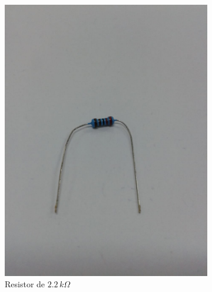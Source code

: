 \documentclass[
	12pt,				%
	openright,			%
	twoside,			%
	a4paper,			%
	article,	
	english,			%
	french,				%
	spanish,			%
	brazil				%
	]{abntex2}
\begin{document}
\begin{figure}[H]\center
	\begin{subfigure}[H]{0.3\textwidth}\center
		\includegraphics[trim=7cm 10cm 9cm 18cm, clip, width=\textwidth]{res22.jpeg}
		\caption{Resistor de $2.2\, k\Omega$}
	\end{subfigure}
\hfill
	\begin{subfigure}[H]{0.3\textwidth}\center

\end{subfigure}
\end{figure}
\end{document}
